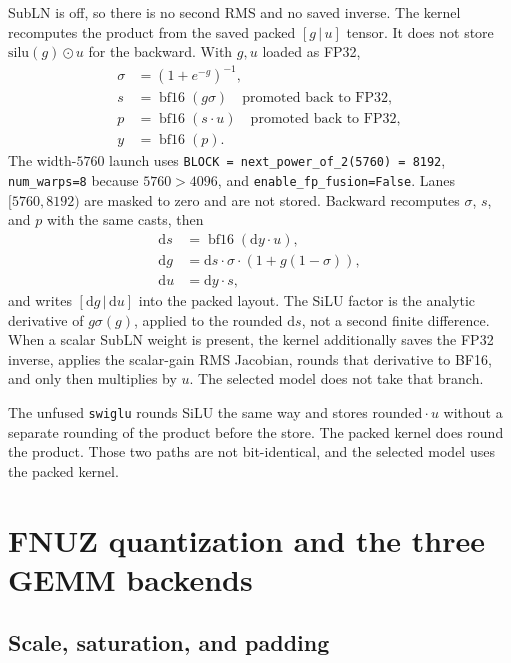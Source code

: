 \documentclass[11pt]{article}
\DeclareRobustCommand{\code}[1]{\texttt{#1}}
\newcommand{\bfsixteen}{\operatorname{bf16}}
\begin{document}
SubLN is off, so there is no second RMS and no saved inverse. The kernel
recomputes the product from the saved packed \([g\,|\,u]\) tensor. It does
not store \(\mathrm{silu}(g)\odot u\) for the backward. With
\(g,u\) loaded as FP32,
\begin{align*}
\sigma &= (1+e^{-g})^{-1},\\
s &= \bfsixteen(g\sigma)\quad\text{promoted back to FP32},\\
p &= \bfsixteen(s\cdot u)\quad\text{promoted back to FP32},\\
y &= \bfsixteen(p).
\end{align*}
The width-\(5760\) launch uses
\code{BLOCK = next\_power\_of\_2(5760) = 8192},
\code{num\_warps=8} because \(5760>4096\), and
\code{enable\_fp\_fusion=False}. Lanes \([5760,8192)\) are masked to zero
and are not stored. Backward recomputes \(\sigma\), \(s\), and \(p\) with
the same casts, then
\begin{align*}
\mathrm{d}s &= \bfsixteen(\mathrm{d}y\cdot u),\\
\mathrm{d}g &= \mathrm{d}s\cdot\sigma\cdot(1+g(1-\sigma)),\\
\mathrm{d}u &= \mathrm{d}y\cdot s,
\end{align*}
and writes \([\mathrm{d}g\,|\,\mathrm{d}u]\) into the packed layout. The
SiLU factor is the analytic derivative of \(g\sigma(g)\), applied to the
rounded \(\mathrm{d}s\), not a second finite difference. When a scalar SubLN
weight is present, the kernel additionally saves the FP32 inverse, applies
the scalar-gain RMS Jacobian, rounds that derivative to BF16, and only then
multiplies by \(u\). The selected model does not take that branch.

The unfused \code{swiglu} rounds SiLU the same way and stores
\(\mathrm{rounded}\cdot u\) without a separate rounding of the product
before the store. The packed kernel does round the product. Those two paths
are not bit-identical, and the selected model uses the packed kernel.

\section{FNUZ quantization and the three GEMM backends}

\subsection{Scale, saturation, and padding}
\end{document}
